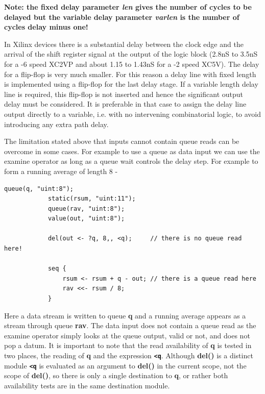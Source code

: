        {\bf Note: the fixed delay parameter {\em len} gives the number of cycles
        to be delayed but the variable delay parameter {\em varlen} is the
        number of cycles delay minus one!}      
            
        In Xilinx devices there is a substantial delay between the clock edge
        and the arrival of the shift register signal at the output of the logic
        block (2.8nS to 3.5nS for a -6 speed XC2VP and about 1.15 to 1.43nS
        for  a -2 speed XC5V). The delay for a flip-flop is very much smaller.
        For this reason a delay line with fixed length is implemented using a
        flip-flop for the last delay stage. If a variable length delay line is
        required, this flip-flop is not inserted and hence the significant
        output delay must be considered. It is preferable in that case to
        assign the delay line output directly to a variable, i.e. with no
        intervening combinatorial logic, to avoid introducing any extra path
        delay.
        
        The limitation stated above that inputs cannot contain queue reads
        can be overcome in some cases. For example to use a queue as data input
        we can use the examine operator as long as a queue wait controls the
        delay step. For example to form a running average of length 8 -

        \begin{lstlisting}[gobble=12, language=threepl]
            queue(q, "uint:8");
            static(rsum, "uint:11");
            queue(rav, "uint:8");
            value(out, "uint:8");
            
            del(out <- ?q, 8,, <q);     // there is no queue read here!
            
            seq {
                rsum <- rsum + q - out; // there is a queue read here
                rav <<- rsum / 8;
            }
        \end{lstlisting}
        Here a data stream is written to queue {\bf q} and a running average
        appears as a stream through queue {\bf rav}. The data input does not
        contain a queue read as the examine operator simply looks at the queue
        output, valid or not, and does not pop a datum. It is important to note
        that the read availability of {\bf q} is tested in two places, the
        reading of {\bf q} and the expression {\bf \verb'<q'}. Although {\bf
        del()} is a distinct module {\bf \verb'<q'} is evaluated as an argument
        to {\bf del()} in the current scope, not the scope of {\bf del()}, so
        there is only a single destination to {\bf q}, or rather both
        availability tests are in the same destination module.
        
